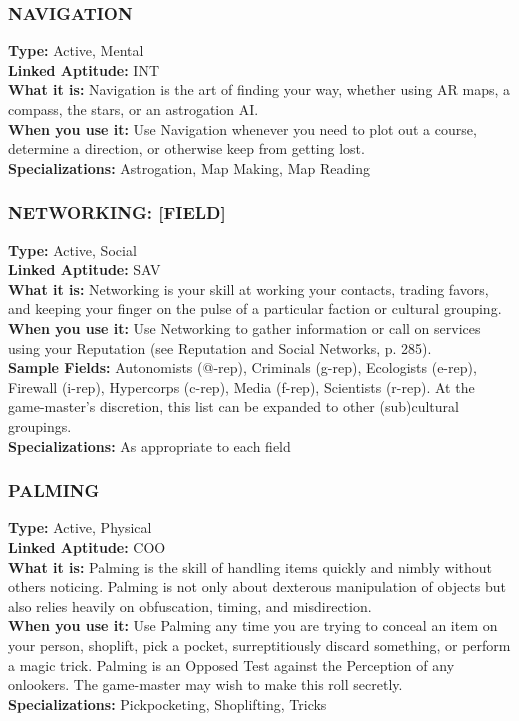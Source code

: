 \subsubsection{NAVIGATION}
\textbf{Type:} Active, Mental
\\ \textbf{Linked Aptitude:} INT
\\ \textbf{What it is:} Navigation is the art of finding your way,
whether using AR maps, a compass, the stars, or an
astrogation AI.
\\ \textbf{When you use it:} Use Navigation whenever you
need to plot out a course, determine a direction, or
otherwise keep from getting lost.
\\ \textbf{Specializations:} Astrogation, Map Making, Map
Reading

\subsubsection{NETWORKING: [FIELD]}
\textbf{Type:} Active, Social
\\ \textbf{Linked Aptitude:} SAV
\\ \textbf{What it is:} Networking is your skill at working your
contacts, trading favors, and keeping your finger on
the pulse of a particular faction or cultural grouping.
\\ \textbf{When you use it:} Use Networking to gather information or call on services using your Reputation (see
Reputation and Social Networks, p. 285).
\\ \textbf{Sample Fields:} Autonomists (@-rep), Criminals (g-rep),
Ecologists (e-rep), Firewall (i-rep), Hypercorps (c-rep), Media (f-rep), Scientists (r-rep). At the game-master’s discretion, this list can be expanded to
other (sub)cultural groupings.
\\ \textbf{Specializations:} As appropriate to each field

\subsubsection{PALMING}
\textbf{Type:} Active, Physical
\\ \textbf{Linked Aptitude:} COO
\\ \textbf{What it is:} Palming is the skill of handling items quickly and nimbly without others noticing. Palming is not
only about dexterous manipulation of objects but also
relies heavily on obfuscation, timing, and misdirection.
\\ \textbf{When you use it:} Use Palming any time you are
trying to conceal an item on your person, shoplift,
pick a pocket, surreptitiously discard something, or
perform a magic trick. Palming is an Opposed Test
against the Perception of any onlookers. The game-master may wish to make this roll secretly.
\\ \textbf{Specializations:} Pickpocketing, Shoplifting, Tricks


